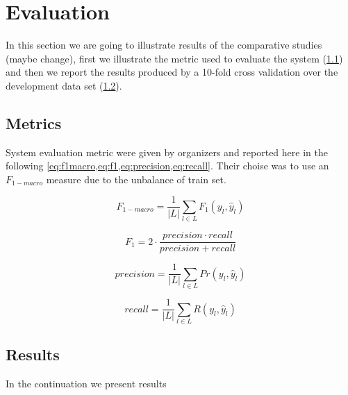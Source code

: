 \section{Evaluation} \label{sec:evaluation}

In this section we are going to illustrate results of the comparative studies (maybe change), first we illustrate the metric used to evaluate the system (\cref{subsec:metric}) and then we report the results produced by a 10-fold cross validation over the development data set (\cref{subsec:results}).

\subsection{Metrics} \label{subsec:metric}

System evaluation metric were given by organizers and reported here in the following \cref{eq:f1macro,eq:f1,eq:precision,eq:recall}. Their choise was to use an $F_{1-macro}$ measure due to the unbalance of train set.

\begin{multicols}{2}
\begin{equation} \label{eq:f1macro}
F_{1-macro} = \frac{1}{|L|} \displaystyle\sum_{l\in L} F_1(y_l, \hat{y}_l)
\end{equation}

\begin{equation} \label{eq:f1}
F_1 = 2 \cdot \frac{precision \cdot recall }{precision + recall}
\end{equation}

\begin{equation} \label{eq:precision}
precision = \frac{1}{|L|} \displaystyle\sum_{l\in L} Pr(y_l, \hat{y}_l)
\end{equation}

\begin{equation} \label{eq:recall}
recall = \frac{1}{|L|} \displaystyle\sum_{l\in L} R(y_l, \hat{y}_l)
\end{equation}
\end{multicols}



\subsection{Results} \label{subsec:results}

In the continuation we present results 


